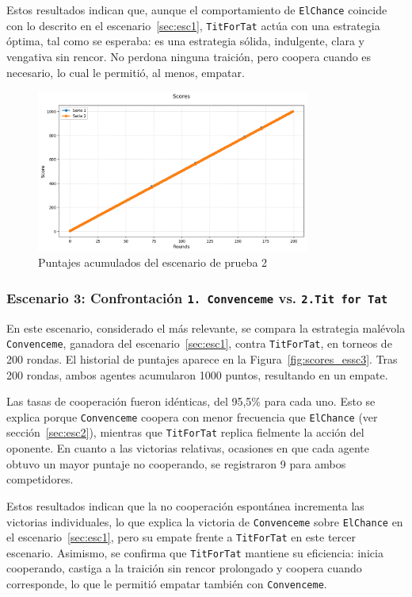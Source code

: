 \documentclass{article}
\begin{document}
Estos resultados indican que, aunque el comportamiento de \texttt{ElChance} coincide 
con lo descrito en el escenario~\ref{sec:esc1}, \texttt{TitForTat} actúa con 
una estrategia óptima, tal como se esperaba: es una estrategia sólida, indulgente, 
clara y vengativa sin rencor. No perdona ninguna traición, pero coopera cuando es 
necesario, lo cual le permitió, al menos, empatar.

\begin{figure}[H]        
  \centering             
  \includegraphics[width=0.8\textwidth]{diagrams/escenario2.png}
  \caption{Puntajes acumulados del escenario de prueba 2}
  \label{fig:scores_essc2}
\end{figure}
 
\subsubsection{Escenario 3: Confrontación 
  \texttt{1. Convenceme} vs. \texttt{2.Tit for Tat}}\label{sec:esc3}

En este escenario, considerado el más relevante, se compara la estrategia malévola 
\texttt{Convenceme}, ganadora del escenario~\ref{sec:esc1}, contra \texttt{TitForTat}, 
en torneos de 200 rondas. El historial de puntajes aparece en la 
Figura~\ref{fig:scores_essc3}. Tras 200 rondas, ambos agentes acumularon 1000 puntos, 
resultando en un empate.

Las tasas de cooperación fueron idénticas, del 95,5\% para cada uno. 
Esto se explica porque \texttt{Convenceme} coopera con menor frecuencia 
que \texttt{ElChance} (ver sección~\ref{sec:esc2}), mientras que 
\texttt{TitForTat} replica fielmente la acción del oponente. 
En cuanto a las victorias relativas, ocasiones en que cada agente obtuvo 
un mayor puntaje no cooperando, se registraron 9 para ambos competidores.

Estos resultados indican que la no cooperación espontánea 
incrementa las victorias individuales, lo que explica la victoria de 
\texttt{Convenceme} sobre \texttt{ElChance} en el escenario~\ref{sec:esc1}, 
pero su empate frente a \texttt{TitForTat} en este tercer escenario. 
Asimismo, se confirma que \texttt{TitForTat} mantiene su eficiencia: 
inicia cooperando, castiga a la traición sin rencor prolongado y 
coopera cuando corresponde, lo que le permitió empatar 
también con \texttt{Convenceme}.
\end{document}
